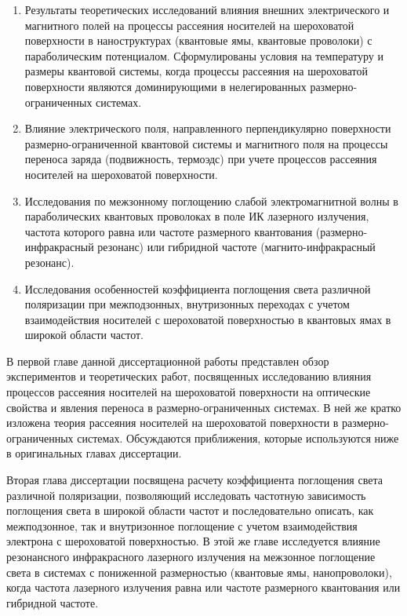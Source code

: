 {}
\begin{enumerate}
	\item Результаты теоретических исследований влияния внешних электрического и магнитного полей на процессы рассеяния носителей на шероховатой поверхности в наноструктурах (квантовые ямы, квантовые проволоки) с параболическим потенциалом. Сформулированы условия на температуру и размеры квантовой системы, когда процессы рассеяния на шероховатой поверхности являются доминирующими в нелегированных размерно-ограниченных системах.
	\item Влияние электрического поля, направленного перпендикулярно поверхности размерно-ограниченной квантовой системы и магнитного поля на процессы переноса заряда (подвижность, термоэдс) при учете процессов рассеяния носителей на шероховатой поверхности.
	\item Исследования по межзонному поглощению слабой электромагнитной волны в параболических квантовых проволоках в поле ИК лазерного излучения, частота которого равна или частоте размерного квантования (размерно-инфракрасный резонанс) или гибридной частоте (магнито-инфракрасный резонанс).
	\item Исследования особенностей коэффициента поглощения света различной поляризации при межподзонных, внутризонных переходах с учетом взаимодействия носителей с шероховатой поверхностью в квантовых ямах в широкой области частот.
\end{enumerate}

\ifsynopsis
\else
В первой главе данной диссертационной работы представлен обзор экспериментов и теоретических работ, посвященных исследованию влияния процессов рассеяния носителей на шероховатой поверхности на оптические свойства и явления переноса в размерно-ограниченных системах. В ней же кратко изложена теория рассеяния носителей на шероховатой поверхности в размерно-ограниченных системах. Обсуждаются приближения, которые используются ниже в оригинальных главах диссертации.

Вторая глава диссертации посвящена расчету коэффициента поглощения света различной поляризации, позволяющий исследовать частотную зависимость поглощения света в широкой области частот и последовательно описать, как межподзонное, так и внутризонное поглощение с учетом взаимодействия электрона с шероховатой поверхностью.
В этой же главе исследуется влияние резонансного инфракрасного лазерного излучения на межзонное поглощение света в системах с пониженной размерностью (квантовые ямы, нанопроволоки), когда частота лазерного излучения равна или частоте размерного квантования или гибридной частоте.

